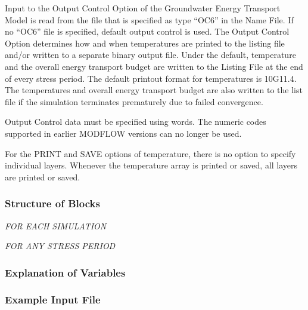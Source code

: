 Input to the Output Control Option of the Groundwater Energy Transport Model is read from the file that is specified as type ``OC6'' in the Name File. If no ``OC6'' file is specified, default output control is used. The Output Control Option determines how and when temperatures are printed to the listing file and/or written to a separate binary output file.  Under the default, temperature and the overall energy transport budget are written to the Listing File at the end of every stress period. The default printout format for temperatures is 10G11.4.  The temperatures and overall energy transport budget are also written to the list file if the simulation terminates prematurely due to failed convergence.

Output Control data must be specified using words.  The numeric codes supported in earlier MODFLOW versions can no longer be used.

For the PRINT and SAVE options of temperature, there is no option to specify individual layers.  Whenever the temperature array is printed or saved, all layers are printed or saved.

\vspace{5mm}
\subsubsection{Structure of Blocks}
\vspace{5mm}

\noindent \textit{FOR EACH SIMULATION}

\vspace{5mm}
\noindent \textit{FOR ANY STRESS PERIOD}


\vspace{5mm}
\subsubsection{Explanation of Variables}
\begin{description}

\end{description}

\vspace{5mm}
\subsubsection{Example Input File}

